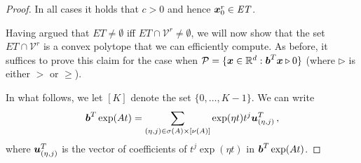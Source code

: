 \begin{proof}
In all cases it holds that $c>0$ and hence
$\boldsymbol{x}_{0}^{r}\in\mathit{ET}$.






Having argued that
$\mathit{ET}\neq\emptyset$ iff $\mathit{ET}\cap
\mathcal{V}^{r}\neq\emptyset$,
we will now show that the set $\mathit{ET}\cap \mathcal{V}^{r}$ is a
convex polytope that we can efficiently compute. As before, it
suffices to prove this claim for the case when
$\mathcal{P}=\lbrace \boldsymbol{x}\in\mathbb{R}^{d}:
\boldsymbol{b}^{T}\boldsymbol{x}\triangleright 0\rbrace$
(where $\triangleright$ is either $>$ or $\geq$).

In what follows, we let $[K]$ denote the set $\lbrace 0,\ldots,K-1 \rbrace$. We can write
\begin{align*}
\boldsymbol{b}^{T}\exp(At)=\sum\limits_{(\eta,j)\in\sigma(A)\times
  [\nu(A)]} \exp(\eta t)t^{j} \boldsymbol{u}_{(\eta,j)}^{T} \, ,
\end{align*}
where $\boldsymbol{u}_{(\eta,j)}^{T}$ is the vector of coefficients of
$t^j\exp(\eta t)$ in $\boldsymbol{b}^{T}\exp(At)$.


\end{proof}
